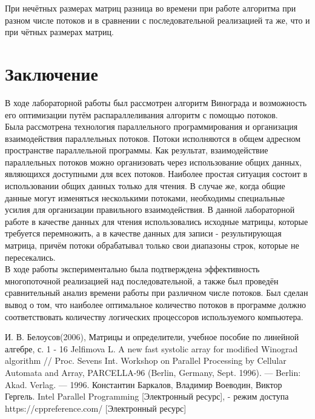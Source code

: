 \documentclass[12pt, a4paper]{report}
\begin{document}
 	При нечётных размерах матриц разница во времени при работе алгоритма при разном числе потоков и в сравнении с последовательной реализацией та же, что и при чётных размерах матриц.

	\chapter*{Заключение}
	В ходе лабораторной работы был рассмотрен алгоритм Винограда и возможность его оптимизации путём распараллеливания алгоритм с помощью потоков.\\
	
	Была рассмотрена технология параллельного программирования и организация взаимодействия параллельных потоков. Потоки исполняются в общем адресном пространстве параллельной программы. Как результат, взаимодействие параллельных потоков можно организовать через использование общих данных, являющихся доступными для всех потоков. Наиболее простая ситуация состоит в использовании общих данных только для чтения. В случае же, когда общие данные могут изменяться несколькими потоками, необходимы специальные усилия для организации правильного взаимодействия. В данной лабораторной работе в качестве данных для чтения использовались исходные матрицы, которые требуется перемножить, а в качестве данных для записи - результирующая матрица, причём потоки обрабатывал только свои диапазоны строк, которые не пересекались.\\
	
	В ходе работы экспериментально была подтверждена эффективность многопоточной реализацией над последовательной, а также был проведён сравнительный анализ времени работы при различном числе потоков. Был сделан вывод о том, что наиболее оптимальное количество потоков в программе должно соответствовать количеству логических процессоров используемого компьютера.
	
	\newpage
	
	\begin{thebibliography}{}
	И. В. Белоусов(2006), Матрицы и определители, учебное пособие по линейной алгебре, с. 1 - 16
	 Jelfimova L. A new fast systolic array for modified Winograd algorithm // Proc. Sevens Int. Workshop on Parallel Processing by Cellular Automata and Array, PARCELLA-96 (Berlin, Germany, Sept. 1996). — Berlin: Akad. Verlag. — 1996.
	 Константин Баркалов, Владимир Воеводин, Виктор Гергель. Intel Parallel Programming [Электронный ресурс], - режим доступа
	 https://cppreference.com/ [Электронный ресурс]
	\end{thebibliography}
\end{document}
